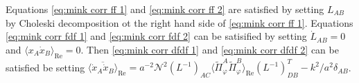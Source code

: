 Equations \eqref{eq:mink corr ff 1} and \eqref{eq:mink corr ff 2} are satisfied by setting $L_{AB}$ by Choleski decomposition ot the right hand side of \eqref{eq:mink corr ff 1}. Equations \eqref{eq:mink corr fdf 1} and \eqref{eq:mink corr fdf 2} can be satisified by setting $\dot{L}_{AB} = 0$ and $\langle x_A\dot{x}_B\rangle_\mathrm{Re} = 0$. Then \eqref{eq:mink corr dfdf 1} and \eqref{eq:mink corr dfdf 2} can be satisfied be setting $\overline{\langle \dot{x}_A\dot{x}_B\rangle}_\mathrm{Re} = a^{-2}\mathcal{N}^2(L^{-1})_{AC}\langle\tilde{\Pi}_\varphi^A\tilde{\Pi}_\varphi^B\rangle_\mathrm{Re}(L^{-1})^T_{DB} - k^2/a^2\delta_{AB}$.


